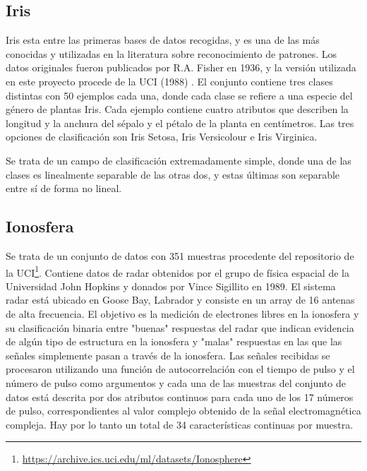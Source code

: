 \subsection{Iris}




Iris esta entre las primeras bases de datos recogidas, y es una de las más conocidas y utilizadas en la literatura sobre reconocimiento de patrones. Los datos originales fueron publicados por R.A. Fisher en 1936, y la versión utilizada en este proyecto procede de la UCI (1988) \cite{iris-dataset}.
El conjunto contiene tres clases distintas con 50 ejemplos cada una, donde cada clase se refiere a una especie del género de plantas Iris. Cada ejemplo contiene cuatro atributos que describen la longitud y la anchura del sépalo y el pétalo de la planta en centímetros. Las tres opciones de clasificación son Iris Setosa, Iris Versicolour e Iris Virginica.

Se trata de un campo de clasificación extremadamente simple, donde una de las clases es linealmente separable de las otras dos, y estas últimas son separable entre sí de forma no lineal.



\subsection{Ionosfera}

Se trata de un conjunto de datos con 351 muestras procedente del repositorio de la UCI\footnote{\url{https://archive.ics.uci.edu/ml/datasets/Ionosphere}}. Contiene datos de radar obtenidos por el grupo de física espacial de la Universidad John Hopkins y donados por Vince Sigillito en 1989. El sistema radar está ubicado en Goose Bay, Labrador y consiste en un array de 16 antenas de alta frecuencia. El objetivo es la medición de electrones libres en la ionosfera y su clasificación binaria entre "buenas" respuestas del radar que indican evidencia de algún tipo de estructura en la ionosfera y "malas" respuestas en las que las señales simplemente pasan a través de la ionosfera. Las señales recibidas se procesaron utilizando una función de autocorrelación con el tiempo de pulso y el número de pulso como argumentos y cada una de las muestras del conjunto de datos está descrita por dos atributos continuos para cada uno de los 17 números de pulso, correspondientes al valor complejo obtenido de la señal electromagnética compleja. Hay por lo tanto un total de 34 características continuas por muestra.

